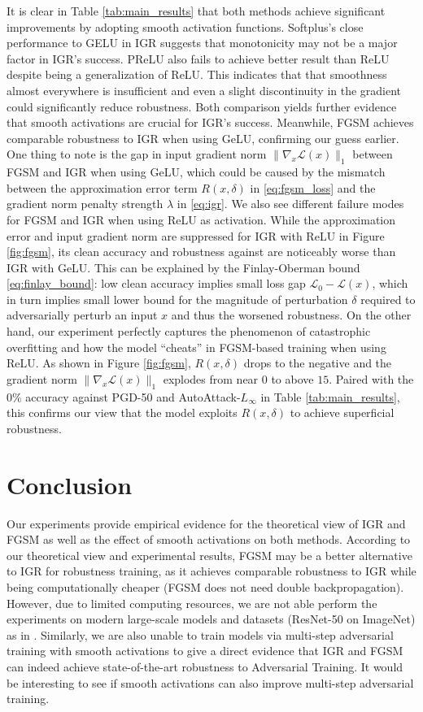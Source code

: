 \documentclass{article}
\begin{document}
It is clear in Table \ref{tab:main_results} that both methods achieve significant improvements by adopting smooth activation functions. Softplus's close performance to GELU in IGR suggests that monotonicity may not be a major factor in IGR's success. PReLU also fails to achieve better result than ReLU despite being a generalization of ReLU. This indicates that that smoothness almost everywhere is insufficient and even a slight discontinuity in the gradient could significantly reduce robustness. Both comparison yields further evidence that smooth activations are crucial for IGR's success. Meanwhile, FGSM achieves comparable robustness to IGR when using GeLU, confirming our guess earlier. One thing to note is the gap in input gradient norm $\|\nabla_x \mathcal{L}(x)\|_1$ between FGSM and IGR when using GeLU, which could be caused by the mismatch between the approximation error term $R(x, \delta)$ in \eqref{eq:fgsm_loss} and the gradient norm penalty strength $\lambda$ in \eqref{eq:igr}. We also see different failure modes for FGSM and IGR when using ReLU as activation. While the approximation error and input gradient norm are suppressed for IGR with ReLU in Figure \ref{fig:fgsm}, its clean accuracy and robustness against are noticeably worse than IGR with GeLU. This can be explained by the Finlay-Oberman bound \eqref{eq:finlay_bound}: low clean accuracy implies small loss gap $\mathcal{L}_0 - \mathcal{L}(x)$, which in turn implies small lower bound for the magnitude of perturbation $\delta$ required to adversarially perturb an input $x$ and thus the worsened robustness. On the other hand, our experiment perfectly captures the phenomenon of catastrophic overfitting and how the model ``cheats'' in FGSM-based training when using ReLU. As shown in Figure \ref{fig:fgsm}, $R(x, \delta)$ drops to the negative and the gradient norm $\|\nabla_x \mathcal{L}(x)\|_1$ explodes from near $0$ to above $15$. Paired with the $0\%$ accuracy against PGD-50 and AutoAttack-$L_\infty$ in Table \ref{tab:main_results}, this confirms our view that the model exploits $R(x, \delta)$ to achieve superficial robustness.

\section{Conclusion}

Our experiments provide empirical evidence for the theoretical view of IGR and FGSM as well as the effect of smooth activations on both methods. According to our theoretical view and experimental results, FGSM may be a better alternative to IGR for robustness training, as it achieves comparable robustness to IGR while being computationally cheaper (FGSM does not need double backpropagation). However, due to limited computing resources, we are not able perform the experiments on modern large-scale models and datasets (ResNet-50 on ImageNet) as in \cite{rodríguezmuñoz2024characterizingmodelrobustnessnatural}. Similarly, we are also unable to train models via multi-step adversarial training with smooth activations to give a direct evidence that IGR and FGSM can indeed achieve state-of-the-art robustness to Adversarial Training. It would be interesting to see if smooth activations can also improve multi-step adversarial training.


\setlength{\bibsep}{5pt} 

\end{document}
